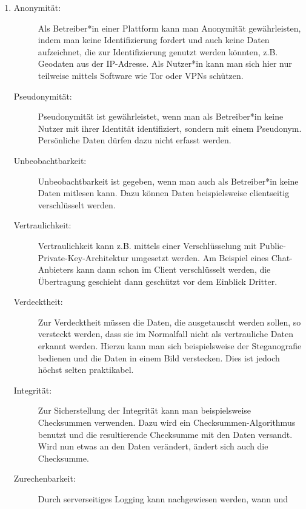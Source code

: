 \documentclass[a4paper,11pt]{scrartcl}
\begin{document}
\begin{enumerate}[1.]
    \item
        \begin{description}
            \item[Anonymität:]
                Als Betreiber*in einer Plattform kann man Anonymität gewährleisten,
                indem man keine Identifizierung fordert und auch keine Daten
                aufzeichnet, die zur Identifizierung genutzt werden könnten,
                z.B. Geodaten aus der IP-Adresse. Als Nutzer*in kann man sich hier
                nur teilweise mittels Software wie Tor oder VPNs schützen.
            \item[Pseudonymität:]
                Pseudonymität ist gewährleistet, wenn man als Betreiber*in keine
                Nutzer mit ihrer Identität identifiziert, sondern mit einem
                Pseudonym. Persönliche Daten dürfen dazu nicht erfasst werden.
            \item[Unbeobachtbarkeit:]
                Unbeobachtbarkeit ist gegeben, wenn man auch als Betreiber*in
                keine Daten mitlesen kann. Dazu können Daten beispielsweise
                clientseitig verschlüsselt werden.
            \item[Vertraulichkeit:]
                Vertraulichkeit kann z.B. mittels einer Verschlüsselung mit
                Public-Private-Key-Architektur umgesetzt werden. Am Beispiel
                eines Chat-Anbieters kann dann schon im Client verschlüsselt
                werden, die Übertragung geschieht dann geschützt vor dem
                Einblick Dritter.
            \item[Verdecktheit:]
                Zur Verdecktheit müssen die Daten, die ausgetauscht werden sollen,
                so versteckt werden, dass sie im Normalfall nicht als vertrauliche
                Daten erkannt werden. Hierzu kann man sich beispielsweise der
                Steganografie bedienen und die Daten in einem Bild verstecken.
                Dies ist jedoch höchst selten praktikabel.
            \item[Integrität:]
                Zur Sicherstellung der Integrität kann man beispielsweise
                Checksummen verwenden. Dazu wird ein Checksummen-Algorithmus
                benutzt und die resultierende Checksumme mit den Daten versandt.
                Wird nun etwas an den Daten verändert, ändert sich auch die
                Checksumme.
            \item[Zurechenbarkeit:]
                Durch serverseitiges Logging kann nachgewiesen werden, wann und

\end{description}
\end{enumerate}
\end{document}
